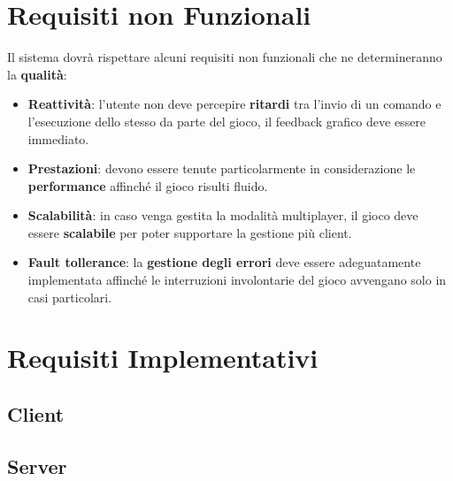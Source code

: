             
	\section{Requisiti non Funzionali}
        Il sistema dovrà rispettare alcuni requisiti non funzionali che ne determineranno la \textbf{qualità}:
        \begin{itemize}
            \item \textbf{Reattività}: l'utente non deve percepire \textbf{ritardi} tra l'invio di un comando e l'esecuzione dello stesso da parte del gioco, il feedback grafico deve essere immediato.
            
            \item \textbf{Prestazioni}: devono essere tenute particolarmente in considerazione le \textbf{performance} affinché il gioco risulti fluido.
            
            \item \textbf{Scalabilità}: in caso venga gestita la modalità multiplayer, il gioco deve essere \textbf{scalabile} per poter supportare la gestione più client.
            
            \item \textbf{Fault tollerance}: la \textbf{gestione degli errori} deve essere adeguatamente implementata affinché le interruzioni involontarie del gioco avvengano solo in casi particolari.
            

        \end{itemize}
	\section{Requisiti Implementativi}
    \subsection{Client}
    \subsection{Server}